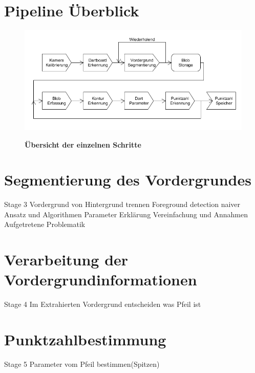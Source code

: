 \section{Pipeline Überblick}
\label{sec:pipeline}
\begin{figure}
\includegraphics[width=\textwidth]{media/pipeline.png}\\
\caption{\textbf{Übersicht der einzelnen Schritte}}
\label{Fig:pipeline}
\end{figure}

\section{Segmentierung des Vordergrundes}
\label{sec:segmentation}
Stage 3 Vordergrund von Hintergrund trennen
Foreground detection naiver Ansatz und Algorithmen
Parameter Erklärung
Vereinfachung und Annahmen
Aufgetretene Problematik
\section{Verarbeitung der Vordergrundinformationen}
\label{sec:foreground}
Stage 4 Im Extrahierten Vordergrund entscheiden was Pfeil ist
\section{Punktzahlbestimmung}
\label{sec:score}
Stage 5 Parameter vom Pfeil bestimmen(Spitzen)

